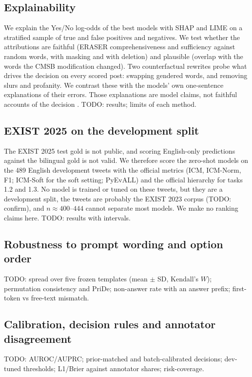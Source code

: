 \subsection{Explainability}
\label{sec:xai}
We explain the Yes/No log-odds of the best models with SHAP and LIME on a stratified sample of true and false
positives and negatives. We test whether the attributions are faithful (ERASER comprehensiveness and sufficiency
against random words, with masking and with deletion) and plausible (overlap with the words the CMSB modification
changed). Two counterfactual rewrites probe what drives the decision on every scored post: swapping gendered words,
and removing slurs and profanity. We contrast these with the models' own one-sentence explanations of their
errors. Those explanations are model claims, not faithful accounts of the decision \citep{turpin2023}.
TODO: results; limits of each method.

\subsection{EXIST 2025 on the development split}
\label{sec:exist-dev}
The EXIST 2025 test gold is not public, and scoring English-only predictions against the bilingual gold is not
valid. We therefore score the zero-shot models on the 489 English development tweets with the official metrics
(ICM, ICM-Norm, F1; ICM-Soft for the soft setting; PyEvALL) and the official hierarchy for tasks 1.2 and 1.3.
No model is trained or tuned on these tweets, but they are a development split, the tweets are probably the EXIST
2023 corpus (TODO: confirm), and $n \approx 400$--$444$ cannot separate most models. We make no ranking claims here.
TODO: results with intervals.

\subsection{Robustness to prompt wording and option order}
TODO: spread over five frozen templates (mean $\pm$ SD, Kendall's $W$); permutation consistency and PriDe;
non-answer rate with an answer prefix; first-token vs free-text mismatch.

\subsection{Calibration, decision rules and annotator disagreement}
TODO: AUROC/AUPRC; prior-matched and batch-calibrated decisions; dev-tuned thresholds; L1/Brier against annotator
shares; risk-coverage.

